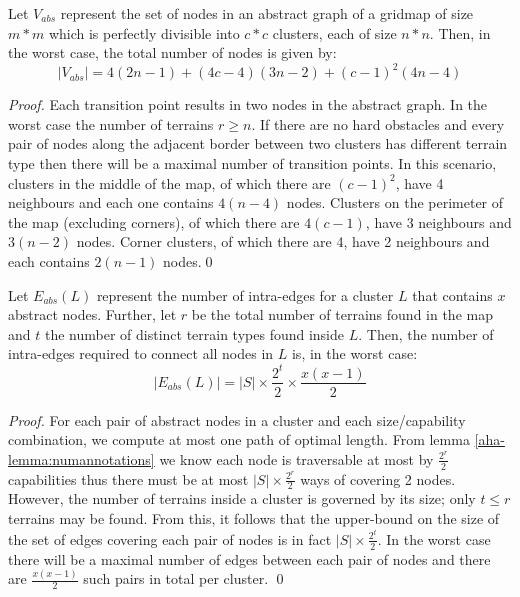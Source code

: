 \begin{lemma}
\label{aha-lemma:maxnodes}
Let $V_{abs}$ represent the set of nodes in an abstract graph of a gridmap of size $m*m$ which is perfectly divisible into $c*c$ clusters, each of size $n*n$. Then, in the worst case, the total number of nodes is given by:
$$|V_{abs}| = 4(2n-1) + (4c - 4)(3n-2) + (c-1)^2(4n-4)$$
\end{lemma}

\begin{proof}
Each transition point results in two nodes in the abstract graph. 
In the worst case the number of terrains $r \geq n$. 
If there are no hard obstacles and every pair of nodes along the adjacent border between two clusters has different terrain type then there will be a maximal number of transition points. 
In this scenario, clusters in the middle of the map, of which there are $(c-1)^2$, have 4 neighbours and each one contains $4(n-4)$ nodes. 
Clusters on the perimeter of the map (excluding corners), of which there are $4(c-1)$, have 3 neighbours and $3(n-2)$ nodes. 
Corner clusters, of which there are 4, have 2 neighbours and each contains $2(n-1)$ nodes.\qed
\end{proof}

\begin{lemma}
\label{aha-lemma:maxedgesincluster}
Let $E_{abs}(L)$ represent the number of intra-edges for a cluster $L$ that contains $x$ abstract nodes. Further, let $r$ be the total number of terrains found in the map and $t$ the number of distinct terrain types found inside $L$. Then, the number of intra-edges required to connect all nodes in $L$ is, in the worst case:
 $$|E_{abs}(L)| = |S|\times \frac{2^t}{2} \times \frac{x(x-1)}{2}$$
 \end{lemma}

\begin{proof}
For each pair of abstract nodes in a cluster and each size/capability combination, we compute at most one path of optimal length. 
From lemma \ref{aha-lemma:numannotations} we know each node is traversable at most by $\frac{2^r}{2}$ capabilities thus there must be at most $|S|\times \frac{2^r}{2}$ ways of covering 2 nodes. 
However, the number of terrains inside a cluster is governed by its size; only $t \leq r$ terrains may be found. 
From this, it follows that the upper-bound on the size of the set of edges covering each pair of nodes is in fact $|S| \times \frac{2^t}{2}$. 
In the worst case there will be a maximal number of edges between each pair of nodes and there are $\frac{x(x-1)}{2}$ such pairs in total per cluster. \qed
\end{proof}


